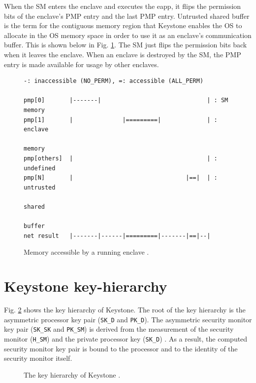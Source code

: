\noindent
When the SM enters the enclave and executes the eapp, it flips the permission bits of the enclave's PMP entry and the last PMP entry. Untrusted shared buffer is the term for the contiguous memory region that Keystone enables the OS to allocate in the OS memory space in order to use it as an enclave's communication buffer. This is shown below in Fig. \ref{sm-pmp-4}.
The SM just flips the permission bits back when it leaves the enclave. When an enclave is destroyed by the SM, the PMP entry is made available for usage by other enclaves.
\begin{figure}[H]
\begin{lstlisting}[frame=single,showspaces=true]
-: inaccessible (NO_PERM), =: accessible (ALL_PERM)

pmp[0]       |-------|                              | : SM memory
pmp[1]       |              |=========|             | : enclave 
                                                        memory
pmp[others]  |                                      | : undefined
pmp[N]       |                                |==|  | : untrusted 
                                                        shared 
                                                        buffer
net result   |-------|------|=========|-------|==|--|
\end{lstlisting}
\caption{Memory accessible by a running enclave \cite{keystone-doc}. \label{sm-pmp-4}}
\end{figure}


\section{Keystone key-hierarchy}
Fig. \ref{keystone-key-hierarchy} shows the key hierarchy of Keystone. The root of the key hierarchy is the asymmetric processor key pair (\texttt{SK\_D} and  \texttt{PK\_D}). The asymmetric security monitor key pair (\texttt{SK\_SK} and \texttt{PK\_SM}) is derived from the measurement of the security monitor (\texttt{H\_SM}) and the private processor key (\texttt{SK\_D}) \cite{keystone-doc}.
As a result, the computed security monitor key pair is bound to the processor and to the identity of the security monitor itself.

\begin{figure}[h!]
    \centering
    
    \caption{The key hierarchy of Keystone \cite{keystone-doc}.}
    \label{keystone-key-hierarchy}
\end{figure}
